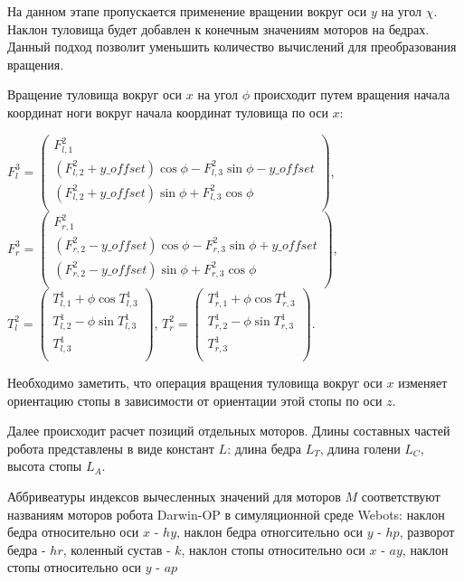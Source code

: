 На данном этапе пропускается применение вращении вокруг оси $y$ на угол $\chi$. Наклон туловища будет добавлен к конечным значениям моторов на бедрах. Данный подход позволит уменьшить количество вычислений для преобразования вращения.

Вращение туловища вокруг оси $x$ на угол $\phi$ происходит путем вращения начала координат ноги вокруг начала координат туловища по оси $x$:

\begin{center}
$F^{3}_{l} = \begin{pmatrix}
F^{2}_{l,1} \\
(F^{2}_{l,2} + y\_offset) \cos \phi - F^{2}_{l,3} \sin \phi - y\_offset \\
(F^{2}_{l,2} + y\_offset) \sin \phi + F^{2}_{l,3} \cos \phi \\
\end{pmatrix}$, $F^{3}_{r} = \begin{pmatrix}
F^{2}_{r,1} \\
(F^{2}_{r,2} - y\_offset) \cos \phi - F^{2}_{r,3} \sin \phi + y\_offset \\
(F^{2}_{r,2} - y\_offset) \sin \phi + F^{2}_{r,3} \cos \phi \\
\end{pmatrix}$,\\
$T^{2}_{l} = \begin{pmatrix}
T^{1}_{l,1} + \phi \cos T^{1}_{l,3} \\
T^{1}_{l,2} - \phi \sin T^{1}_{l,3} \\
T^{1}_{l,3} \\
\end{pmatrix}$,
$T^{2}_{r} = \begin{pmatrix}
T^{1}_{r,1} + \phi \cos T^{1}_{r,3}  \\
T^{1}_{r,2} - \phi \sin T^{1}_{r,3}  \\
T^{1}_{r,3} \\
\end{pmatrix}$.
\end{center}

Необходимо заметить, что операция вращения туловища вокруг оси $x$ изменяет ориентацию стопы в зависимости от ориентации этой стопы по оси $z$.

Далее происходит расчет позиций отдельных моторов. Длины составных частей робота представлены в виде констант $L$: длина бедра $L_{T}$, длина голени $L_{C}$, высота стопы $L_{A}$.

Аббривеатуры индексов вычесленных значений для моторов $M$ соответствуют названиям моторов робота Darwin-OP в симуляционной среде Webots: наклон бедра относительно оси $x$ - $hy$, наклон бедра отногсительно оси $y$ - $hp$, разворот бедра - $hr$, коленный сустав - $k$, наклон стопы относительно оси $x$ - $ay$, наклон стопы относительно оси $y$ - $ap$

